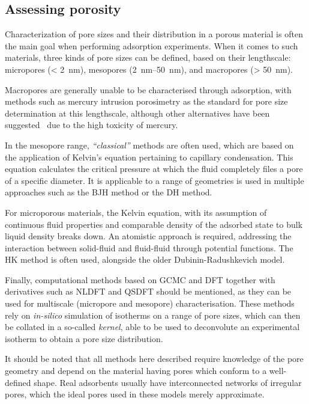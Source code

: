
\subsection{Assessing porosity}

Characterization of pore sizes and their distribution in a porous material
is often the main goal when performing adsorption experiments.
When it comes to such materials, three kinds of pore sizes can be
defined, based on their lengthscale: micropores (\SI{< 2}{\nano\metre}),
mesopores (\SIrange{2}{50}{\nano\metre}), and macropores (\SI{> 50}{\nano\metre}).

Macropores are generally unable to be characterised through adsorption,
with methods such as mercury intrusion porosimetry as the standard for pore
size determination at this lengthscale, although other alternatives have
been suggested~\cite{rouquerolCharacterizationMacroporousSolids2012} due
to the high toxicity of mercury.

In the mesopore range, \textit{``classical''} methods are often
used, which are based on the application of Kelvin's equation
pertaining to capillary condensation. This equation calculates the
critical pressure at which the fluid completely files a pore of a
specific diameter. It is applicable to a range of geometries
is used in multiple approaches such as the \gls{BJH} method 
or the \gls{DH} method.

For microporous materials, the Kelvin equation, with its assumption
of continuous fluid properties and comparable density of the adsorbed
state to bulk liquid density breaks down. An atomistic approach
is required, addressing the interaction between solid-fluid
and fluid-fluid through potential functions. The \gls{HK} method 
is often used, alongside the older Dubinin-Radushkevich
model.

Finally, computational methods based on \gls{GCMC} and \gls{DFT} 
together with derivatives such as \gls{NLDFT} and \gls{QSDFT} 
should be mentioned, as they can be used for multiscale
(micropore and mesopore) characterisation. These methods rely on
\textit{in-silico} simulation of isotherms on a range of pore sizes,
which can then be collated in a so-called \textit{kernel}, able to
be used to deconvolute an experimental isotherm to obtain a
pore size distribution.

It should be noted that all methods here described require knowledge of
the pore geometry and depend on the material having pores which
conform to a well-defined shape. Real adsorbents usually have
interconnected networks of irregular pores, which the ideal pores
used in these models merely approximate.

